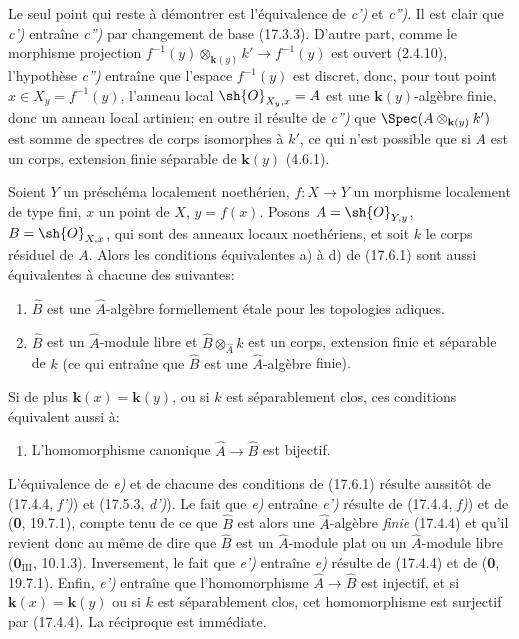 Le seul point qui reste à démontrer est l'équivalence de \emph{c')} et \emph{c'')}. Il est clair que \emph{c')} entraîne \emph{c'')} par changement de base (17.3.3). D'autre part, comme le morphisme projection $f^{-1}(y)\otimes_{\mathbf{k}(y)}k'\to f^{-1}(y)$ est ouvert (2.4.10), l'hypothèse \emph{c'')} entraîne que l'espace $f^{-1}(y)$ est discret, donc, pour tout point $x\in X_y=f^{-1}(y)$, l'anneau local $\sh{O}_{X_y,x}=A$ est une $\boldsymbol{k}(y)$-algèbre finie, donc un anneau local artinien; en outre il résulte de \emph{c'')} que $\Spec(A\otimes_{\mathbf{k}(y)}k')$ est somme de spectres de corps isomorphes à $k'$, ce qui n'est possible que si $A$ est un corps, extension finie séparable de $\boldsymbol{k}(y)$ (4.6.1).

\begin{proposition}[17.6.3]
\label{IV.17.6.3}
Soient $Y$ un préschéma \textup{localement noethérien}, $f:X\to Y$ un morphisme localement de type fini, $x$ un point de $X$, $y=f(x)$. Posons $A=\sh{O}_{Y,y}$, $B=\sh{O}_{X,x}$, qui sont des anneaux locaux noethériens, et soit $k$ le corps résiduel de $A$. Alors les conditions équivalentes \textup{a)} à \textup{d)} de \textup{(17.6.1)} sont aussi équivalentes à chacune des suivantes:
\begin{enumerate}
  \item[\textup{e)}] $\widehat B$ est une $\widehat A$-algèbre formellement étale pour les topologies adiques.
  \item[\textup{e$'$)}] $\widehat B$ est un $\widehat A$-module libre et $\widehat B\otimes_{\widehat A}k$ est un corps, extension finie et séparable de $k$ \textup{(ce qui entraîne que $\widehat B$ est une $\widehat A$-algèbre} finie\textup{)}.
\end{enumerate}
Si de plus $\boldsymbol{k}(x)=\boldsymbol{k}(y)$, ou si $k$ est séparablement clos, ces conditions équivalent aussi à:
\begin{enumerate}
  \item[\textup{e$''$)}] L'homomorphisme canonique $\widehat A\to\widehat B$ est bijectif.
\end{enumerate}
\end{proposition}

L'équivalence de \emph{e)} et de chacune des conditions de (17.6.1) résulte aussitôt de (17.4.4, \emph{f')}) et (17.5.3, \emph{d')}). Le fait que \emph{e)} entraîne \emph{e')} résulte de (17.4.4, \emph{f)}) et de (\textbf{0}, 19.7.1), compte tenu de ce que $\widehat B$ est alors une $\widehat A$-algèbre \emph{finie} (17.4.4) et qu'il revient donc au même de dire que $\widehat B$ est un $\widehat A$-module plat ou un $\widehat A$-module libre ($\mathbf{0}_{\mathrm{III}}$, 10.1.3). Inversement, le fait que \emph{e')} entraîne \emph{e)} résulte de (17.4.4) et de (\textbf{0}, 19.7.1). Enfin, \emph{e')} entraîne que l'homomorphisme $\widehat A\to\widehat B$ est injectif, et si $\boldsymbol{k}(x)=\boldsymbol{k}(y)$ ou si $k$ est séparablement clos, cet homomorphisme est surjectif par (17.4.4). La réciproque est immédiate.

